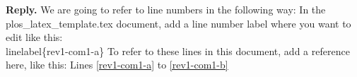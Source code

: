 \documentclass{article}
\newenvironment{Reply}{\noindent\color{BlueViolet}\textbf{Reply.}}{\vspace{1em}}
\begin{document}
\begin{Reply}
   We are going to refer to line numbers in the following way: In the plos\_latex\_template.tex document, add a line number label where you want to edit like this: \\ linelabel\{rev1-com1-a\}
   To refer to these lines in this document, add a reference here, like this: Lines   \ref{rev1-com1-a} to \ref{rev1-com1-b}
   

\end{Reply}
\end{document}
